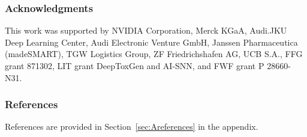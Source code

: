 \documentclass{article}
\begin{document}
\subsubsection*{Acknowledgments}
This work was supported by 
NVIDIA Corporation,
Merck KGaA, 
Audi.JKU Deep Learning Center, 
Audi Electronic Venture GmbH, 
Janssen Pharmaceutica (madeSMART), 
TGW Logistics Group,
ZF Friedrichshafen AG, UCB S.A.,
FFG grant 871302,
LIT grant DeepToxGen and AI-SNN,
and
FWF grant P 28660-N31.

\subsubsection*{References}
References are provided in Section~\ref{sec:Areferences} in the appendix.









\newpage
\end{document}
